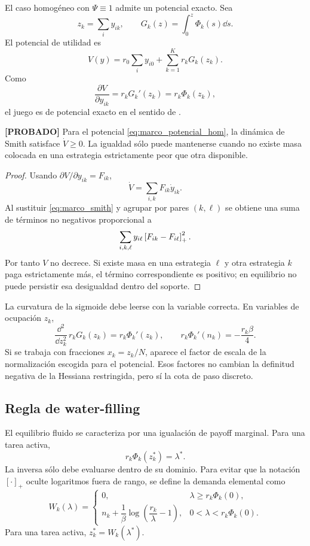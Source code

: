 El caso homogéneo con $\Psi\equiv1$ admite un potencial exacto. Sea
\[
  z_k=\sum_i y_{ik},
  \qquad
  G_k(z)=\int_0^z\Phi_k(s)\dd s.
\]
El potencial de utilidad es
\begin{equation}
  V(y)=r_0\sum_i y_{i0}+\sum_{k=1}^{K}r_kG_k(z_k).
  \label{eq:marco_potencial_hom}
\end{equation}
Como
\[
  \frac{\partial V}{\partial y_{ik}}
  =
  r_kG_k'(z_k)
  =
  r_k\Phi_k(z_k),
\]
el juego es de potencial exacto en el sentido de \citet{monderer1996potential}.

\begin{proposicion} \textbf{[PROBADO]}
Para el potencial \eqref{eq:marco_potencial_hom}, la dinámica de Smith satisface
$\dot V\ge0$. La igualdad sólo puede mantenerse cuando no existe masa colocada en una
estrategia estrictamente peor que otra disponible.
\end{proposicion}

\begin{proof}
Usando $\partial V/\partial y_{ik}=F_{ik}$,
\[
  \dot V=\sum_{i,k}F_{ik}\dot y_{ik}.
\]
Al sustituir \eqref{eq:marco_smith} y agrupar por pares $(k,\ell)$ se obtiene una suma
de términos no negativos proporcional a
\[
  \sum_{i,k,\ell}y_{i\ell}\left[F_{ik}-F_{i\ell}\right]_{+}^2.
\]
Por tanto $V$ no decrece. Si existe masa en una estrategia $\ell$ y otra estrategia
$k$ paga estrictamente más, el término correspondiente es positivo; en equilibrio no
puede persistir esa desigualdad dentro del soporte.
\end{proof}

\begin{observacion}
La curvatura de la sigmoide debe leerse con la variable correcta. En variables de
ocupación $z_k$,
\[
  \frac{\dd^2}{\dd z_k^2}\,r_kG_k(z_k)
  =
  r_k\Phi_k'(z_k),
  \qquad
  r_k\Phi_k'(n_k)=-\frac{r_k\beta}{4}.
\]
Si se trabaja con fracciones $x_k=z_k/N$, aparece el factor de escala de la
normalización escogida para el potencial. Esos factores no cambian la definitud
negativa de la Hessiana restringida, pero sí la cota de paso discreto.
\end{observacion}

\subsection{Regla de water-filling}

El equilibrio fluido se caracteriza por una igualación de payoff marginal. Para una
tarea activa,
\[
  r_k\Phi_k(z_k^*)=\lambda^*.
\]
La inversa sólo debe evaluarse dentro de su dominio. Para evitar que la notación
$[\cdot]_+$ oculte logaritmos fuera de rango, se define la demanda elemental como
\begin{equation}
  W_k(\lambda)=
  \begin{cases}
  0,
  & \lambda\ge r_k\Phi_k(0),\\[4pt]
  n_k+\dfrac{1}{\beta}\log\!\left(\dfrac{r_k}{\lambda}-1\right),
  & 0<\lambda<r_k\Phi_k(0).
  \end{cases}
  \label{eq:marco_water_hom}
\end{equation}
Para una tarea activa, $z_k^*=W_k(\lambda^*)$.

